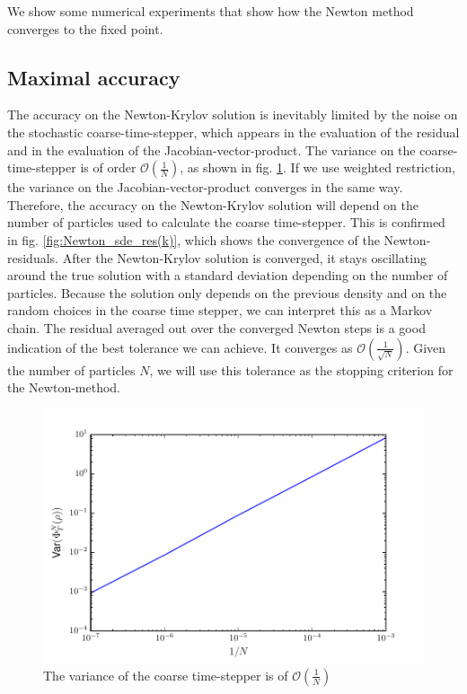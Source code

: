 


We show some numerical experiments that show how the Newton method converges to the fixed point. 


\subsection{Maximal accuracy}

The accuracy on the Newton-Krylov solution is inevitably limited by the noise on the stochastic coarse-time-stepper, which appears in the evaluation of the residual and in the evaluation of the Jacobian-vector-product. The variance on the coarse-time-stepper is of order $\mathcal{O}(\frac{1}{N})$, as shown in fig. \ref{fig:Variance_on_cts(N-1)}. If we use weighted restriction, the variance on the Jacobian-vector-product converges in the same way.  Therefore, the accuracy on the Newton-Krylov solution will depend on the number of particles used to calculate the coarse time-stepper.  This is confirmed in fig. \ref{fig:Newton_sde_res(k)}, which shows the convergence of the Newton-residuals. After the Newton-Krylov solution is converged, it stays oscillating around the true solution with a standard deviation depending on the number of particles. Because the solution only depends on the previous density and on the random choices in the coarse time stepper, we can interpret this as a Markov chain. The residual averaged out over the converged Newton steps is a good indication of the best tolerance we can achieve. It converges as $\mathcal{O}(\frac{1}{\sqrt{N}})$. Given the number of particles $N$,  we will use this tolerance as the stopping criterion for the Newton-method.



\begin{figure}[h]
\centering
\includegraphics[width=0.5\linewidth]{../Problems/WeightedParticles/checkSystem/plots/Variance_on_cts(N-1)}
\caption{The variance of the coarse time-stepper is of $\mathcal{O}(\frac{1}{N})$ }
\label{fig:Variance_on_cts(N-1)}
\end{figure}



